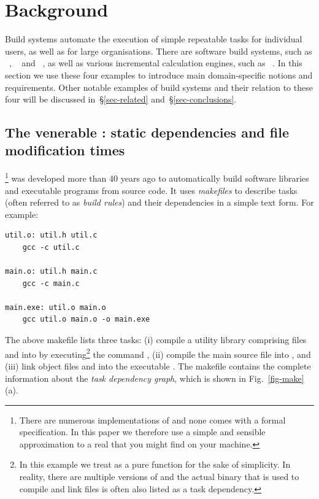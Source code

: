 \clearpage
\section{Background}\label{sec-background}

Build systems automate the execution of simple repeatable tasks for individual
users, as well as for large organisations. There are software build systems,
such as \Make~\cite{feldman1979make}, \Shake~\cite{mitchell2012shake} and
\Bazel~\cite{bazel}, as well as various incremental calculation engines, such
as \Excel~\cite{advanced_excel}. In this section we use these four examples to
introduce main domain-specific notions and requirements. Other notable examples
of build systems and their relation to these four will be discussed
in~\S\ref{sec-related} and~\S\ref{sec-conclusions}.

\subsection{The venerable \Make: static dependencies and file modification times}
\label{sec-background-make}

\Make\footnote{There are numerous implementations of \Make and none comes with a
formal specification. In this paper we therefore use a simple and sensible
approximation to a real \Make that you might find on your machine.} was developed
more than 40 years ago to automatically build software libraries and executable
programs from source code. It uses \emph{makefiles} to describe tasks (often
referred to as \emph{build rules}) and their dependencies in a simple text form.
For example:

\vspace{1mm}
\begin{verbatim}
util.o: util.h util.c
    gcc -c util.c

main.o: util.h main.c
    gcc -c main.c

main.exe: util.o main.o
    gcc util.o main.o -o main.exe
\end{verbatim}
\vspace{1mm}

\noindent
The above makefile lists three tasks: (i) compile a utility library comprising
files  and  into  by
executing\footnote{In this example we treat  as a pure function for the
sake of simplicity. In reality, there are multiple versions of  and the
actual binary that is used to compile and link files is often also listed as a task
dependency.} the command , (ii) compile the main source file
 into , and (iii) link object files  and
 into the executable . The makefile contains the
complete information about the \emph{task dependency graph}, which is shown in
Fig.~\ref{fig-make}(a).

